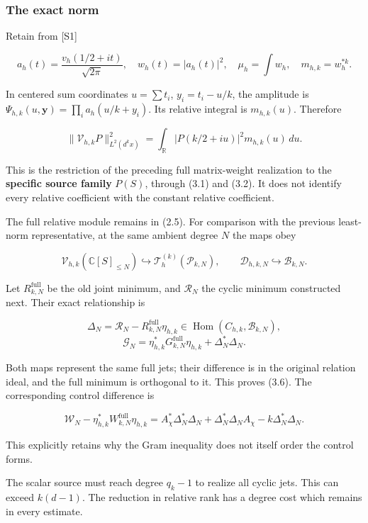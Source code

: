 \subsubsection{The exact norm}\label{cyclic_sum:the-exact-norm}

Retain from {[}S1{]}

\[a_h(t)=\frac{v_h(1/2+it)}{\sqrt{2\pi}},\quad
w_h(t)=|a_h(t)|^2,\quad \mu_h=\int w_h,\quad m_{h,k}=w_h^{*k}.\]

In centered sum coordinates \(u=\sum t_i\), \(y_i=t_i-u/k\), the
amplitude is \(\Psi_{h,k}(u,\mathbf y)=\prod_i a_h(u/k+y_i)\). Its
relative integral is \(m_{h,k}(u)\). Therefore

\[\boxed{\|\mathcal V_{h,k}P\|_{L^2(d^kx)}^2
=\int_{\mathbb R}|P(k/2+iu)|^2m_{h,k}(u)\,du.}\tag{3.5}\]

This is the restriction of the preceding full matrix-weight realization
to the \textbf{specific source family} \(P(S)\), through (3.1) and
(3.2). It does not identify every relative coefficient with the constant
relative coefficient.

The full relative module remains in (2.5). For comparison with the
previous least-norm representative, at the same ambient degree \(N\) the
maps obey

\[\mathcal V_{h,k}(\mathbb C[S]_{\le N})\hookrightarrow
\mathcal T_h^{(k)}(\mathcal P_{k,N}),\qquad
\mathcal D_{h,k,N}\hookrightarrow\mathcal B_{k,N}.\]

Let \(R^{\mathrm{full}}_{k,N}\) be the old joint minimum, and
\(\mathcal R_N\) the cyclic minimum constructed next. Their exact
relationship is

\[\Delta_N=\mathcal R_N-R^{\mathrm{full}}_{k,N}\eta_{h,k}\in
\operatorname{Hom}(C_{h,k},\mathcal B_{k,N}),\]
\[\boxed{\mathcal G_N=\eta_{h,k}^*G^{\mathrm{full}}_{k,N}\eta_{h,k}+\Delta_N^*\Delta_N.}\tag{3.6}\]

Both maps represent the same full jets; their difference is in the
original relation ideal, and the full minimum is orthogonal to it. This
proves (3.6). The corresponding control difference is

\[\mathcal W_N-\eta_{h,k}^*W^{\mathrm{full}}_{k,N}\eta_{h,k}
=A_\chi^*\Delta_N^*\Delta_N+\Delta_N^*\Delta_NA_\chi-k\Delta_N^*\Delta_N.\tag{3.7}\]

This explicitly retains why the Gram inequality does not itself order
the control forms.

The scalar source must reach degree \(q_k-1\) to realize all cyclic
jets. This can exceed \(k(d-1)\). The reduction in relative rank has a
degree cost which remains in every estimate.

